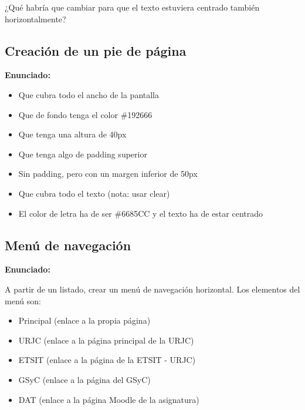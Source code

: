¿Qué habría que cambiar para que el texto estuviera centrado también horizontalmente?

\subsection{Creación de un pie de página}
\label{subsec:pie}

\textbf{Enunciado:}

\begin{itemize}
  \item Que cubra todo el ancho de la pantalla
  \item Que de fondo tenga el color \#192666
  \item Que tenga una altura de 40px
  \item Que tenga algo de padding superior
  \item Sin padding, pero con un margen inferior de 50px
  \item Que cubra todo el texto (nota: usar clear) %
  \item El color de letra ha de ser \#6685CC y el texto ha de estar centrado
\end{itemize}

\subsection{Menú de navegación}
\label{subsec:menuNavegacion}

\textbf{Enunciado:}

A partir de un listado, crear un menú de navegación horizontal. Los elementos del menú son:

\begin{itemize}
  \item Principal (enlace a la propia página)
  \item URJC (enlace a la página principal de la URJC)
  \item ETSIT (enlace a la página de la ETSIT - URJC)
  \item GSyC (enlace a la página del GSyC)
  \item DAT (enlace a la página Moodle de la asignatura)
\end{itemize}

